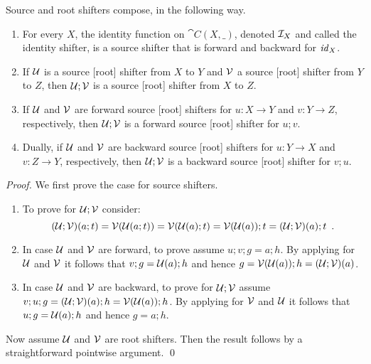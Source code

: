 %
Source and root shifters compose, in the following way.
%
\begin{proposition}
\begin{enumerate}[topsep=\smallskipamount]
\item For every $X$, the identity function on $\cat{C}(X,\_)$, denoted $\mathcal{I}_X$ and called the identity shifter, is a source shifter that is forward and backward for $\mathit{id}_X$.
\item If $\mathcal{U}$ is a source [root] shifter from $X$ to $Y$ and $\mathcal{V}$ a source [root] shifter from $Y$ to $Z$, then $\mathcal{U};\mathcal{V}$ is a source [root] shifter from $X$ to $Z$. 
\item If $\mathcal{U}$ and $\mathcal{V}$ are forward source [root] shifters for $u: X\to Y$ and $v: Y \to Z$, respectively, then $\mathcal{U};\mathcal{V}$ is a forward source [root] shifter for $u;v$.
\item Dually, if $\mathcal{U}$ and $\mathcal{V}$ are backward source [root] shifters for $u: Y\to X$ and $v: Z \to Y$, respectively, then $\mathcal{U};\mathcal{V}$ is a backward source [root] shifter for $v;u$.
\end{enumerate}
\end{proposition}

\begin{fullorname}
\begin{proof}
We first prove the case for source shifters.
\begin{enumerate}
\item To prove  for $\mathcal{U};\mathcal{V}$ consider:
\[ (\mathcal{U};\mathcal{V})(a;t) = \mathcal{V}(\mathcal{U}(a;t))= \mathcal{V}(\mathcal{U}(a);t)=\mathcal{V}(\mathcal{U}(a));t=(\mathcal{U};\mathcal{V})(a);t \enspace. \]

\item In case $\mathcal{U}$ and $\mathcal{V}$ are forward, to prove  assume $u;v;g=a;h$. By applying  for $\mathcal{U}$ and $\mathcal{V}$ it follows that $v;g=\mathcal{U}(a);h$ and hence $g=\mathcal{V}(\mathcal{U}(a));h=(\mathcal{U};\mathcal{V})(a)$.

\item In case $\mathcal{U}$ and $\mathcal{V}$ are backward, to prove  for $\mathcal{U};\mathcal{V}$ assume $v;u;g=(\mathcal{U};\mathcal{V})(a);h=\mathcal{V}(\mathcal{U}(a));h$. By applying  for $\mathcal{V}$ and $\mathcal{U}$ it follows that $u;g=\mathcal{U}(a);h$ and hence $g=a;h$.
\end{enumerate}
%
Now assume $\mathcal{U}$ and $\mathcal{V}$ are root shifters. Then the result follows by a straightforward pointwise argument.
\qed
\end{proof}
\end{fullorname}

